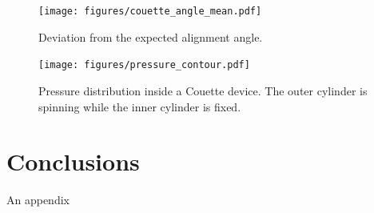 \documentclass[preprint, 10pt]{elsarticle}
\begin{document}
\begin{figure}[!h]
\begin{center}
\texttt{[image: figures/couette\_angle\_mean.pdf]}\\
\end{center}
\caption{Deviation from the expected alignment angle. }\label{fig:angles}
\end{figure} 

\begin{figure}[!h]
\begin{center}
\texttt{[image: figures/pressure\_contour.pdf]}
\end{center}
\caption{Pressure distribution inside a Couette device. The outer cylinder is spinning while the inner cylinder is fixed. }\label{fig:dissipation}
\end{figure}
\section{Conclusions\label{s:conclusions}}


\begin{appendices}
An appendix
\end{appendices}


 

\end{document}
